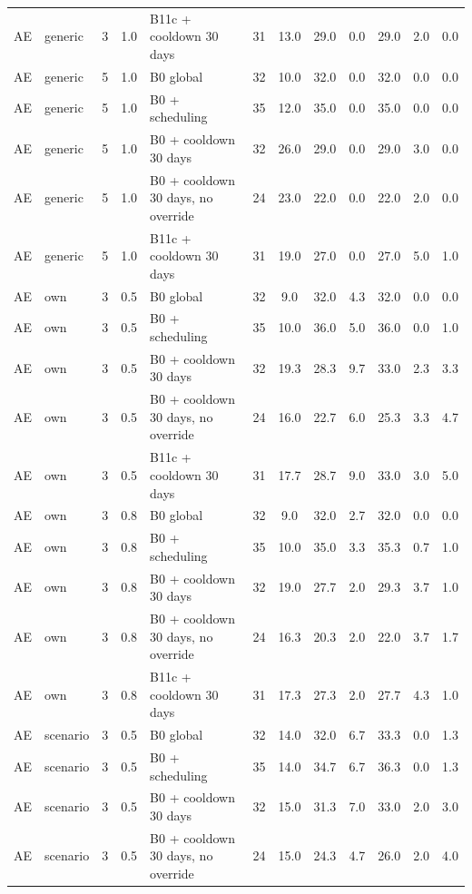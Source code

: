 \begin{longtable}{lllllccccccc}
AE & generic & 3 & 1.0 & B11c + cooldown 30 days & 31 & 13.0 & 29.0 & 0.0 & 29.0 & 2.0 & 0.0 \\
AE & generic & 5 & 1.0 & B0 global & 32 & 10.0 & 32.0 & 0.0 & 32.0 & 0.0 & 0.0 \\
AE & generic & 5 & 1.0 & B0 + scheduling & 35 & 12.0 & 35.0 & 0.0 & 35.0 & 0.0 & 0.0 \\
AE & generic & 5 & 1.0 & B0 + cooldown 30 days & 32 & 26.0 & 29.0 & 0.0 & 29.0 & 3.0 & 0.0 \\
AE & generic & 5 & 1.0 & B0 + cooldown 30 days, no override & 24 & 23.0 & 22.0 & 0.0 & 22.0 & 2.0 & 0.0 \\
AE & generic & 5 & 1.0 & B11c + cooldown 30 days & 31 & 19.0 & 27.0 & 0.0 & 27.0 & 5.0 & 1.0 \\
AE & own & 3 & 0.5 & B0 global & 32 & 9.0 & 32.0 & 4.3 & 32.0 & 0.0 & 0.0 \\
AE & own & 3 & 0.5 & B0 + scheduling & 35 & 10.0 & 36.0 & 5.0 & 36.0 & 0.0 & 1.0 \\
AE & own & 3 & 0.5 & B0 + cooldown 30 days & 32 & 19.3 & 28.3 & 9.7 & 33.0 & 2.3 & 3.3 \\
AE & own & 3 & 0.5 & B0 + cooldown 30 days, no override & 24 & 16.0 & 22.7 & 6.0 & 25.3 & 3.3 & 4.7 \\
AE & own & 3 & 0.5 & B11c + cooldown 30 days & 31 & 17.7 & 28.7 & 9.0 & 33.0 & 3.0 & 5.0 \\
AE & own & 3 & 0.8 & B0 global & 32 & 9.0 & 32.0 & 2.7 & 32.0 & 0.0 & 0.0 \\
AE & own & 3 & 0.8 & B0 + scheduling & 35 & 10.0 & 35.0 & 3.3 & 35.3 & 0.7 & 1.0 \\
AE & own & 3 & 0.8 & B0 + cooldown 30 days & 32 & 19.0 & 27.7 & 2.0 & 29.3 & 3.7 & 1.0 \\
AE & own & 3 & 0.8 & B0 + cooldown 30 days, no override & 24 & 16.3 & 20.3 & 2.0 & 22.0 & 3.7 & 1.7 \\
AE & own & 3 & 0.8 & B11c + cooldown 30 days & 31 & 17.3 & 27.3 & 2.0 & 27.7 & 4.3 & 1.0 \\
AE & scenario & 3 & 0.5 & B0 global & 32 & 14.0 & 32.0 & 6.7 & 33.3 & 0.0 & 1.3 \\
AE & scenario & 3 & 0.5 & B0 + scheduling & 35 & 14.0 & 34.7 & 6.7 & 36.3 & 0.0 & 1.3 \\
AE & scenario & 3 & 0.5 & B0 + cooldown 30 days & 32 & 15.0 & 31.3 & 7.0 & 33.0 & 2.0 & 3.0 \\
AE & scenario & 3 & 0.5 & B0 + cooldown 30 days, no override & 24 & 15.0 & 24.3 & 4.7 & 26.0 & 2.0 & 4.0 \\

\end{longtable}
